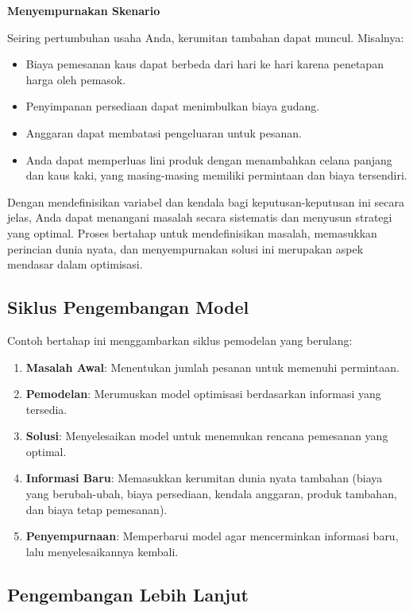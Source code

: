 \textbf{Menyempurnakan Skenario}

Seiring pertumbuhan usaha Anda, kerumitan tambahan dapat muncul. Misalnya:
\begin{itemize}
    \item Biaya pemesanan kaus dapat berbeda dari hari ke hari karena penetapan harga oleh pemasok.
    \item Penyimpanan persediaan dapat menimbulkan biaya gudang.
    \item Anggaran dapat membatasi pengeluaran untuk pesanan.
    \item Anda dapat memperluas lini produk dengan menambahkan celana panjang dan kaus kaki, yang masing-masing memiliki permintaan dan biaya tersendiri.
\end{itemize}

Dengan mendefinisikan variabel dan kendala bagi keputusan-keputusan ini secara jelas, Anda dapat menangani masalah secara sistematis dan menyusun strategi yang optimal. Proses bertahap untuk mendefinisikan masalah, memasukkan perincian dunia nyata, dan menyempurnakan solusi ini merupakan aspek mendasar dalam optimisasi.

\subsection*{Siklus Pengembangan Model}

Contoh bertahap ini menggambarkan siklus pemodelan yang berulang:

\begin{enumerate}
    \item \textbf{Masalah Awal}: Menentukan jumlah pesanan untuk memenuhi permintaan.
    \item \textbf{Pemodelan}: Merumuskan model optimisasi berdasarkan informasi yang tersedia.
    \item \textbf{Solusi}: Menyelesaikan model untuk menemukan rencana pemesanan yang optimal.
    \item \textbf{Informasi Baru}: Memasukkan kerumitan dunia nyata tambahan (biaya yang berubah-ubah, biaya persediaan, kendala anggaran, produk tambahan, dan biaya tetap pemesanan).
    \item \textbf{Penyempurnaan}: Memperbarui model agar mencerminkan informasi baru, lalu menyelesaikannya kembali.
\end{enumerate}

\subsection*{Pengembangan Lebih Lanjut}

